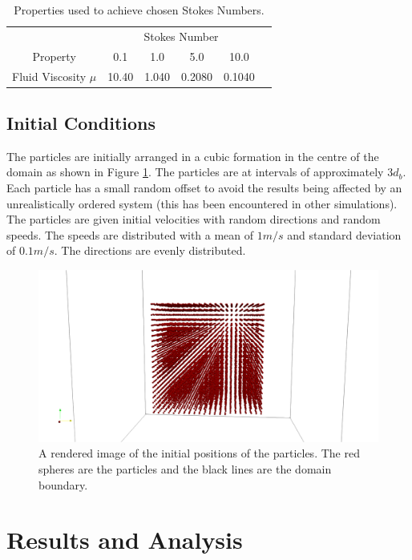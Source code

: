 \documentclass[a4paper,11pt,titlepage]{report}
\begin{document}
\begin{table}[!htb]
\centering
\begin{tabular}{| c c c c c c |}
\hline
& \multicolumn{4}{c}{Stokes Number} &\\
Property & 0.1 & 1.0 & 5.0 & 10.0 & \\
\hline
Fluid Viscosity $\mu$ & 10.40 & 1.040 & 0.2080 & 0.1040 & \\
\hline
\end{tabular}
\caption{Properties used to achieve chosen Stokes Numbers.}
\label{tab:stokes properties}
\end{table}
\label{sec:simulation properties}
\subsection{Initial Conditions}
The particles are initially arranged in a cubic formation in the centre of the domain as shown in Figure \ref{fig:initial_positions}. The particles are at intervals of approximately $3d_b$. Each particle has a small random offset to avoid the results being affected by an unrealistically ordered system (this has been encountered in other simulations). The particles are given initial velocities with random directions and random speeds. The speeds are distributed with a mean of $1 m/s$ and standard deviation of $0.1 m/s$. The directions are evenly distributed.
\begin{figure}[!htb]
\centering
\includegraphics[scale=0.3]{figures/initial_positions.png}
\caption{A rendered image of the initial positions of the particles. The red spheres are the particles and the black lines are the domain boundary.}
\label{fig:initial_positions}
\end{figure}
\label{sec:initial conditions}
\section{Results and Analysis}
\end{document}
